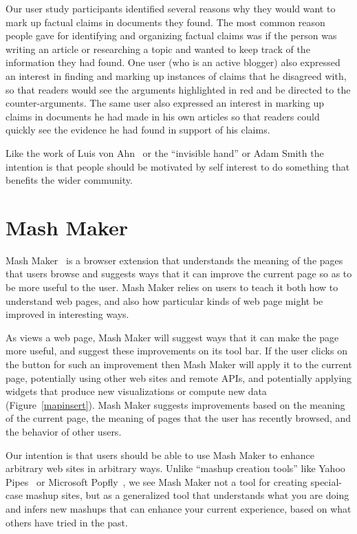 \documentclass{chi2009}
\begin{document}
Our user study participants identified several reasons why they would want to mark up factual claims in documents they found. The most common reason people gave for identifying and organizing factual claims was if the person was writing an article or researching a topic and wanted to keep track of the information they had found. One user (who is an active blogger) also expressed an interest in finding and marking up instances of claims that he disagreed with, so that readers would see the arguments highlighted in red and be directed to the counter-arguments. The same user also expressed an interest in marking up claims in documents he had made in his own articles so that readers could quickly see the evidence he had found in support of his claims. 

Like the work of Luis von Ahn~\cite{vonahn,recaptcha} or the ``invisible hand'' or Adam Smith the intention is that people should be motivated by self interest to do something that benefits the wider community.



\section{Mash Maker}

Mash Maker~\cite{mashmaker} is a browser extension that understands the meaning of the pages that users browse and suggests ways that it can improve the current page so as to be more useful to the user. Mash Maker relies on users to teach it both how to understand web pages, and also how particular kinds of web page might be improved in interesting ways.

As views a web page, Mash Maker will suggest ways that it can make the page more useful, and suggest these improvements on its tool bar. If the user clicks on the button for such an improvement then Mash Maker will apply it to the current page, potentially using other web sites and remote APIs, and potentially applying widgets that produce new visualizations or compute new data (Figure~\ref{mapinsert}). Mash Maker suggests improvements based on the meaning of the current page, the meaning of pages that the user has recently browsed, and the behavior of other users.

Our intention is that users should be able to use Mash Maker to enhance arbitrary web sites in arbitrary ways. Unlike ``mashup creation tools'' like Yahoo Pipes~\cite{pipes} or Microsoft Popfly~\cite{popfly}, we see Mash Maker not a tool for creating special-case mashup sites, but as a generalized tool that understands what you are doing and infers new mashups that can enhance your current experience, based on what others have tried in the past. 
\end{document}
